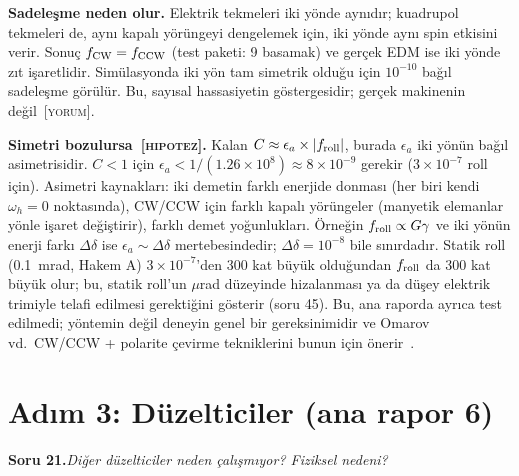 \documentclass[11pt,a4paper]{article}
\newcommand{\YOR}{\textsc{[yorum]}}
\newcommand{\HIP}{\textsc{[hipotez]}}
\newcounter{soru}
\newcommand{\soru}[2]{%
  \par\medskip\noindent\textbf{Soru #1.}\enspace\textit{#2}\par\nopagebreak\smallskip}
\begin{document}
\textbf{Sadeleşme neden olur.} Elektrik tekmeleri iki yönde aynıdır; kuadrupol tekmeleri de, aynı kapalı
yörüngeyi dengelemek için, iki yönde aynı spin etkisini verir. Sonuç $f_{\rm CW}=f_{\rm CCW}$ (test paketi:
9 basamak) ve gerçek EDM ise iki yönde zıt işaretlidir. Simülasyonda iki yön tam simetrik olduğu için
$10^{-10}$ bağıl sadeleşme görülür. Bu, sayısal hassasiyetin göstergesidir; gerçek makinenin değil~\YOR.

\textbf{Simetri bozulursa~\HIP.} Kalan $C\approx\epsilon_a\times|f_{\rm roll}|$, burada $\epsilon_a$
iki yönün bağıl asimetrisidir. $C<1$ için $\epsilon_a<1/(1.26\times10^8)\approx8\times10^{-9}$ gerekir
($3\times10^{-7}$ roll için). Asimetri kaynakları: iki demetin farklı enerjide donması (her biri kendi
$\omega_h=0$ noktasında), CW/CCW için farklı kapalı yörüngeler (manyetik elemanlar yönle işaret değiştirir),
farklı demet yoğunlukları. Örneğin $f_{\rm roll}\propto G\gamma$ ve iki yönün enerji farkı $\Delta\delta$
ise $\epsilon_a\sim\Delta\delta$ mertebesindedir; $\Delta\delta=10^{-8}$ bile sınırdadır. Statik roll
(0.1~mrad, Hakem A) $3\times10^{-7}$'den 300 kat büyük olduğundan $f_{\rm roll}$ da 300 kat büyük olur;
bu, statik roll'un $\mu$rad düzeyinde hizalanması ya da düşey elektrik trimiyle telafi edilmesi gerektiğini
gösterir (soru 45). Bu, ana raporda ayrıca test edilmedi; yöntemin değil deneyin genel bir gereksinimidir
ve Omarov vd.\ CW/CCW + polarite çevirme tekniklerini bunun için önerir~\cite{omarov}.

\section{Adım 3: Düzelticiler (ana rapor 6)}

\soru{21}{Diğer düzelticiler neden çalışmıyor? Fiziksel nedeni?}
\end{document}
